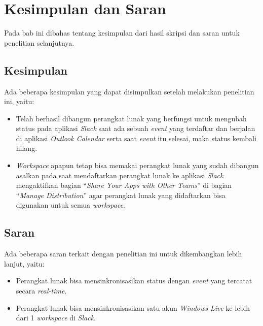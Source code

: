 \chapter{Kesimpulan dan Saran}
\label{chap:kesimpulan dan saran}

Pada bab ini dibahas tentang kesimpulan dari hasil skripsi dan saran untuk penelitian selanjutnya. 

\section{Kesimpulan}
Ada beberapa kesimpulan yang dapat disimpulkan setelah melakukan penelitian ini, yaitu:
\begin{itemize}
    \item Telah berhasil dibangun perangkat lunak yang berfungsi untuk mengubah status pada aplikasi \textit{Slack} saat ada sebuah \textit{event} yang terdaftar dan berjalan di aplikasi \textit{Outlook Calendar} serta saat \textit{event} itu selesai, maka status kembali hilang. 
    \item \textit{Workspace} apapun tetap bisa memakai perangkat lunak yang sudah dibangun asalkan pada saat mendaftarkan perangkat lunak ke aplikasi \textit{Slack} mengaktifkan bagian ``\textit{Share Your Apps with Other Teams}'' di bagian ``\textit{Manage Distribution}'' agar perangkat lunak yang didaftarkan bisa digunakan untuk semua \textit{workspace}. 
\end{itemize}
\section{Saran}
Ada beberapa saran terkait dengan penelitian ini untuk dikembangkan lebih lanjut, yaitu:
\begin{itemize}
    \item Perangkat lunak bisa mensinkronisasikan status dengan \textit{event} yang tercatat secara \textit{real-time}. 
    \item Perangkat lunak bisa mensinkronisasikan satu akun \textit{Windows Live} ke lebih dari 1 \textit{workspace} di \textit{Slack}. 
\end{itemize}
